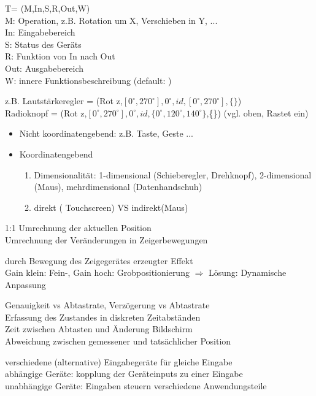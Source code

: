 T= (M,In,S,R,Out,W) \\
M: Operation, z.B. Rotation um X, Verschieben in Y, ...\\
In: Eingabebereich\\
S: Status des Geräts\\
R: Funktion von In nach Out\\
Out: Ausgabebereich\\
W: innere Funktionsbeschreibung (default: {})

z.B. Lautstärkeregler = (Rot z,$[0^\circ,270^\circ],0^\circ,id,[0^\circ,270^\circ],\{\}$)\\
Radioknopf = (Rot z,$[0^\circ,270^\circ],0^\circ,id,\{0^\circ,120^\circ,140^\circ\}$,\{\}) (vgl. oben, Rastet ein)

 \begin{itemize}
\item Nicht koordinatengebend: z.B. Taste, Geste ...
\item Koordinatengebend
\begin{enumerate}
\item Dimensionalität: 1-dimensional (Schieberegler, Drehknopf), 2-dimensional (Maus), mehrdimensional (Datenhandschuh)
\item direkt ( Touchscreen) VS indirekt(Maus)
\end{enumerate}
\end{itemize}


 1:1 Umrechnung der aktuellen Position\\
 Umrechnung der Veränderungen in Zeigerbewegungen 

 durch Bewegung des Zeigegerätes erzeugter Effekt\\
Gain klein: Fein-, Gain hoch: Grobpositionierung $\Rightarrow$ Lösung: Dynamische Anpassung

 Genauigkeit vs Abtastrate, Verzögerung vs Abtastrate      \\
 Erfassung des Zustandes in diskreten Zeitabständen   \\
 Zeit zwischen Abtasten und Änderung Bildschirm      \\
 Abweichung zwischen gemessener und tatsächlicher Position   



  verschiedene (alternative) Eingabegeräte für gleiche Eingabe\\
 abhängige Geräte: kopplung der Geräteinputs zu einer Eingabe \\
\tab unabhängige Geräte:  Eingaben steuern verschiedene Anwendungsteile

